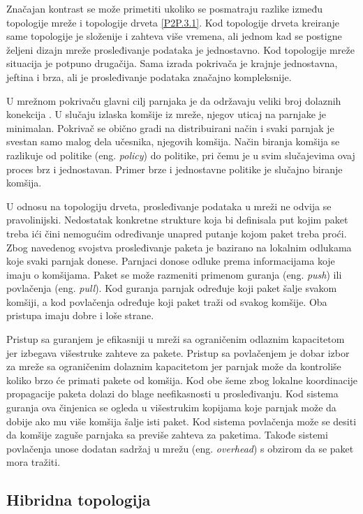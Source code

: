 \documentclass[12pt,oneside]{memoir}
\begin{document}
Značajan kontrast se može primetiti ukoliko se posmatraju razlike između topologije mreže i topologije drveta \ref{P2P.3.1}. Kod topologije drveta kreiranje same topologije je složenije i zahteva više vremena, ali jednom kad se postigne željeni dizajn mreže prosleđivanje podataka je jednostavno. Kod topologije mreže situacija je potpuno drugačija. Sama izrada pokrivača je krajnje jednostavna, jeftina i brza, ali je prosleđivanje podataka značajno kompleksnije. 

U mrežnom pokrivaču glavni cilj parnjaka je da održavaju veliki broj dolaznih konekcija \cite{Shen:2009}. U slučaju izlaska komšije iz mreže, njegov uticaj na parnjake je minimalan. Pokrivač se obično gradi na distribuirani način i svaki parnjak je svestan samo malog dela učesnika, njegovih komšija. Način biranja komšija se razlikuje od politike (eng. \textit{policy}) do politike,
pri čemu je u svim slučajevima ovaj proces brz i jednostavan. Primer brze i jednostavne politike je slučajno biranje komšija. 

U odnosu na topologiju drveta, prosleđivanje podataka u mreži ne odvija se pravolinijski. Nedostatak konkretne strukture koja bi definisala put kojim paket treba ići čini nemogućim određivanje unapred putanje kojom paket treba proći. Zbog navedenog svojstva prosleđivanje paketa je bazirano na lokalnim odlukama koje svaki parnjak donese. Parnjaci donose odluke prema informacijama koje imaju o komšijama. Paket se može razmeniti primenom guranja (eng. \textit{push}) ili povlačenja (eng. \textit{pull}). Kod guranja parnjak određuje koji paket šalje svakom komšiji, a kod povlačenja određuje koji paket traži od svakog komšije. Oba pristupa imaju dobre i loše strane. 

Pristup sa guranjem je efikasniji u mreži sa ograničenim odlaznim kapacitetom jer izbegava višestruke zahteve za pakete. Pristup sa povlačenjem je dobar izbor za mreže sa ograničenim dolaznim kapacitetom jer parnjak može da kontroliše koliko brzo će primati pakete od komšija. Kod obe šeme zbog lokalne koordinacije propagacije paketa dolazi do blage neefikasnosti u prosleđivanju. Kod sistema guranja ova činjenica se ogleda u višestrukim kopijama koje parnjak može da dobije ako mu više komšija šalje isti paket. Kod sistema povlačenja može se desiti da komšije zaguše parnjaka sa previše zahteva za paketima. Takođe sistemi povlačenja unose dodatan sadržaj u mrežu (eng. \textit{overhead}) s obzirom da se paket mora tražiti.

\subsection{Hibridna topologija}
\label{P2P.3.3}
\end{document}
